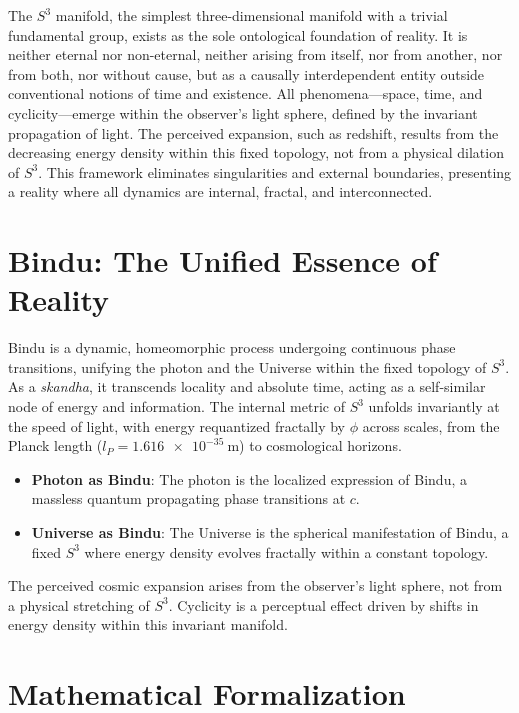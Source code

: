 \documentclass[11pt]{article}
\begin{document}
The $S^3$ manifold, the simplest three-dimensional manifold with a trivial fundamental group, exists as the sole ontological foundation of reality. It is neither eternal nor non-eternal, neither arising from itself, nor from another, nor from both, nor without cause, but as a causally interdependent entity outside conventional notions of time and existence. All phenomena---space, time, and cyclicity---emerge within the observer’s light sphere, defined by the invariant propagation of light. The perceived expansion, such as redshift, results from the decreasing energy density within this fixed topology, not from a physical dilation of $S^3$. This framework eliminates singularities and external boundaries, presenting a reality where all dynamics are internal, fractal, and interconnected.

\section{Bindu: The Unified Essence of Reality}
Bindu is a dynamic, homeomorphic process undergoing continuous phase transitions, unifying the photon and the Universe within the fixed topology of $S^3$. As a \textit{skandha}, it transcends locality and absolute time, acting as a self-similar node of energy and information. The internal metric of $S^3$ unfolds invariantly at the speed of light, with energy requantized fractally by $\phi$ across scales, from the Planck length ($l_P = \SI{1.616e-35}{\meter}$) to cosmological horizons.

\begin{itemize}
    \item \textbf{Photon as Bindu}: The photon is the localized expression of Bindu, a massless quantum propagating phase transitions at $c$.
    \item \textbf{Universe as Bindu}: The Universe is the spherical manifestation of Bindu, a fixed $S^3$ where energy density evolves fractally within a constant topology.
\end{itemize}

The perceived cosmic expansion arises from the observer’s light sphere, not from a physical stretching of $S^3$. Cyclicity is a perceptual effect driven by shifts in energy density within this invariant manifold.

\section{Mathematical Formalization}
\end{document}
